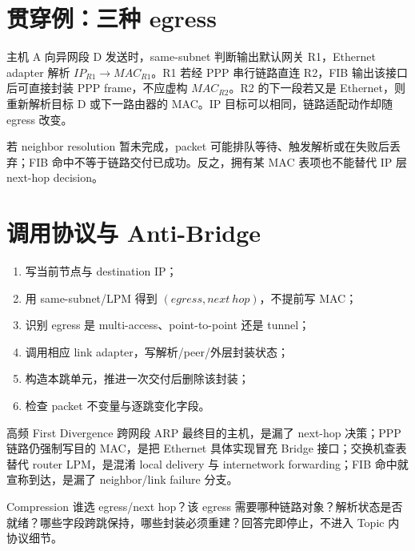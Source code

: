 \documentclass[UTF8,fontset=none,11pt,a4paper]{ctexart}
\begin{document}
\section{贯穿例：三种 egress}

主机 A 向异网段 D 发送时，same-subnet 判断输出默认网关 R1，Ethernet adapter 解析 $IP_{R1}\to MAC_{R1}$。R1 若经 PPP 串行链路直连 R2，FIB 输出该接口后可直接封装 PPP frame，不应虚构 $MAC_{R2}$。R2 的下一段若又是 Ethernet，则重新解析目标 D 或下一路由器的 MAC。IP 目标可以相同，链路适配动作却随 egress 改变。

若 neighbor resolution 暂未完成，packet 可能排队等待、触发解析或在失败后丢弃；FIB 命中不等于链路交付已成功。反之，拥有某 MAC 表项也不能替代 IP 层 next-hop decision。

\section{调用协议与 Anti-Bridge}

\begin{enumerate}
\item 写当前节点与 destination IP；
\item 用 same-subnet/LPM 得到 $(egress,next\ hop)$，不提前写 MAC；
\item 识别 egress 是 multi-access、point-to-point 还是 tunnel；
\item 调用相应 link adapter，写解析/peer/外层封装状态；
\item 构造本跳单元，推进一次交付后删除该封装；
\item 检查 packet 不变量与逐跳变化字段。
\end{enumerate}

\begin{warnbox}{高频 First Divergence}
跨网段 ARP 最终目的主机，是漏了 next-hop 决策；PPP 链路仍强制写目的 MAC，是把 Ethernet 具体实现冒充 Bridge 接口；交换机查表替代 router LPM，是混淆 local delivery 与 internetwork forwarding；FIB 命中就宣称到达，是漏了 neighbor/link failure 分支。
\end{warnbox}

\begin{corebox}{Compression}
谁选 egress/next hop？该 egress 需要哪种链路对象？解析状态是否就绪？哪些字段跨跳保持，哪些封装必须重建？回答完即停止，不进入 Topic 内协议细节。
\end{corebox}
\end{document}
